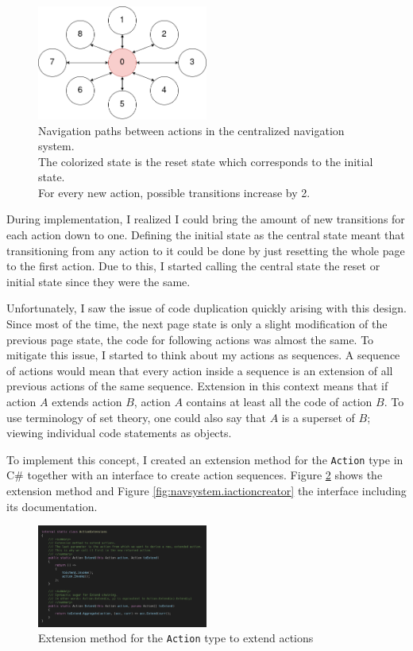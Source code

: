 \begin{figure}
\centering
\caption{Navigation paths between actions in the centralized navigation system. \\The colorized state is the reset state which corresponds to the initial state.\\For every new action, possible transitions increase by 2.}
\label{fig:navsystem.central.overview}
\includegraphics[width=0.5\textwidth]{figures/navigationsystem-diagram/navigationsystem-central-overview.png}
\end{figure}

During implementation, I realized I could bring the amount of new transitions for each action down to one. Defining the initial state as the central state meant that transitioning from any action to it could be done by just resetting the whole page to the first action. Due to this, I started calling the central state the reset or initial state since they were the same.

Unfortunately, I saw the issue of code duplication quickly arising with this design. Since most of the time, the next page state is only a slight modification of the previous page state, the code for following actions was almost the same. To mitigate this issue, I started to think about my actions as sequences. A sequence of actions would mean that every action inside a sequence is an extension of all previous actions of the same sequence. Extension in this context means that if action $A$ extends action $B$, action $A$ contains at least all the code of action $B$. To use terminology of set theory, one could also say that $A$ is a superset of $B$; viewing individual code statements as objects.

To implement this concept, I created an extension method for the \texttt{Action} type in C\# together with an interface to create action sequences. Figure \ref{fig:navsystem.sequences.extension} shows the extension method and Figure \ref{fig:navsystem.iactioncreator} the interface including its documentation.

\begin{figure}
\centering
\caption{Extension method for the \texttt{Action} type to extend actions}
\label{fig:navsystem.sequences.extension}
\includegraphics[width=0.5\textwidth]{figures/code/nav-arch/action-extensions.png}
\end{figure}


